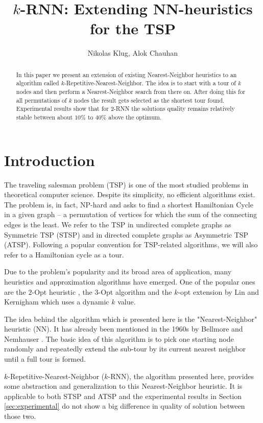 \documentclass[11pt]{article}
\title{$k$-RNN: Extending NN-heuristics for the TSP}
\author{Nikolas Klug, Alok Chauhan}
\begin{document}
	\maketitle
	\begin{abstract}
		In this paper we present an extension of existing Nearest-Neighbor heuristics to an algorithm called $k$-Repetitive-Nearest-Neighbor. 
		The idea is to start with a tour of $k$ nodes and then perform a Nearest-Neighbor search from there on. 
		After doing this for all permutations of $k$ nodes the result gets selected as the shortest tour found. 
		Experimental results show that for $2$-RNN the solutions quality remains relatively stable between about $10\%$ to $40\%$ above the optimum.
	\end{abstract}

	\section{Introduction}
	\label{sec:introduction}
	The traveling salesman problem (TSP) is one of the most studied problems in theoretical computer science. 
	Despite its simplicity, no efficient algorithms exist. 
	The problem is, in fact, NP-hard and asks to find a shortest Hamiltonian Cycle in a given graph -- a permutation of vertices for which the sum of the connecting edges is the least.
	We refer to the TSP in undirected complete graphs as Symmetric TSP (STSP) and in directed complete graphs as Asymmetric TSP (ATSP).
	Following a popular convention for TSP-related algorithms, we will also refer to a Hamiltonian cycle as a tour. 	

	Due to the problem's popularity and its broad area of application, many heuristics and approximation algorithms have emerged. One of the popular ones are the $2$-Opt heuristic \cite{CROES1958}, the $3$-Opt algorithm \cite{LIN1965} and the $k$-opt extension by Lin and Kernigham \cite{LIN1973} which uses a dynamic $k$ value.
	
	The idea behind the algorithm which is presented here is the "Nearest-Neighbor" heuristic (NN).
	It has already been mentioned in the 1960s by Bellmore and Nemhauser \cite{BELLMORE1968}.
	The basic idea of this algorithm is to pick one starting node randomly and repeatedly extend the sub-tour by its current nearest neighbor until a full tour is formed.
	
	$k$-Repetitive-Nearest-Neighbor ($k$-RNN), the algorithm presented here, provides some abstraction and generalization to this Nearest-Neighbor heuristic. 
	It is applicable to both STSP and ATSP and the experimental results in Section \ref{sec:experimental} do not show a big difference in quality of solution between those two.
	
\end{document}
